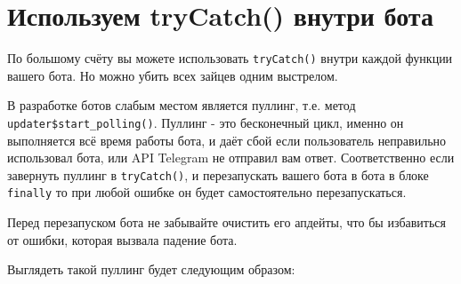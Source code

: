 \documentclass[
]{book}
\begin{document}
\hypertarget{ux438ux441ux43fux43eux43bux44cux437ux443ux435ux43c-trycatch-ux432ux43dux443ux442ux440ux438-ux431ux43eux442ux430}{%
\section{Используем tryCatch() внутри бота}\label{ux438ux441ux43fux43eux43bux44cux437ux443ux435ux43c-trycatch-ux432ux43dux443ux442ux440ux438-ux431ux43eux442ux430}}

По большому счёту вы можете использовать \texttt{tryCatch()} внутри каждой функции вашего бота. Но можно убить всех зайцев одним выстрелом.

В разработке ботов слабым местом является пуллинг, т.е. метод \texttt{updater\$start\_polling()}. Пуллинг - это бесконечный цикл, именно он выполняется всё время работы бота, и даёт сбой если пользователь неправильно использовал бота, или API Telegram не отправил вам ответ. Соответственно если завернуть пуллинг в \texttt{tryCatch()}, и перезапускать вашего бота в бота в блоке \texttt{finally} то при любой ошибке он будет самостоятельно перезапускаться.

Перед перезапуском бота не забывайте очистить его апдейты, что бы избавиться от ошибки, которая вызвала падение бота.

Выглядеть такой пуллинг будет следующим образом:
\end{document}
